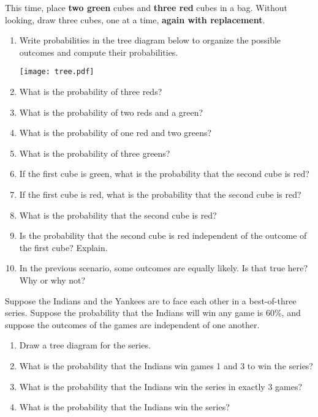 \documentclass[nooutcomes]{ximera}
\begin{document}
\newpage
\begin{problem}
This time, place \textbf{two green} cubes and \textbf{three red} cubes in a bag.  Without looking, draw three cubes, one at a time, \textbf{again with replacement}.  
\begin{enumerate}
\item Write probabilities in the tree diagram below to organize the possible outcomes and compute their probabilities.  
\begin{image}
\texttt{[image: tree.pdf]}
\end{image}
\vspace{.15in}
\item What is the probability of three reds? 
\item What is the probability of two reds and a green? 
\item What is the probability of one red and two greens? 
\item What is the probability of three greens? 
\item If the first cube is green, what is the probability that the second cube is red? 
\item If the first cube is red, what is the probability that the second cube is red? 
\item What is the probability that the second cube is red?  
\item Is the probability that the second cube is red independent of the outcome of the first cube?  Explain. 
\item In the previous scenario, some outcomes are equally likely.  Is that true here?  Why or why not? 
\end{enumerate}
\end{problem}

\newpage

\begin{problem}
Suppose the Indians and the Yankees are to face each other in a best-of-three series.  Suppose the probability that the Indians will win any game is 60\%, and suppose the outcomes of the games are independent of one another.  
\begin{enumerate}
\item Draw a tree diagram for the series.  
\item What is the probability that the Indians win games 1 and 3 to win the series?
\item What is the probability that the Indians win the series in exactly 3 games?
\item What is the probability that the Indians win the series?
\end{enumerate}
\end{problem}
\end{document}
